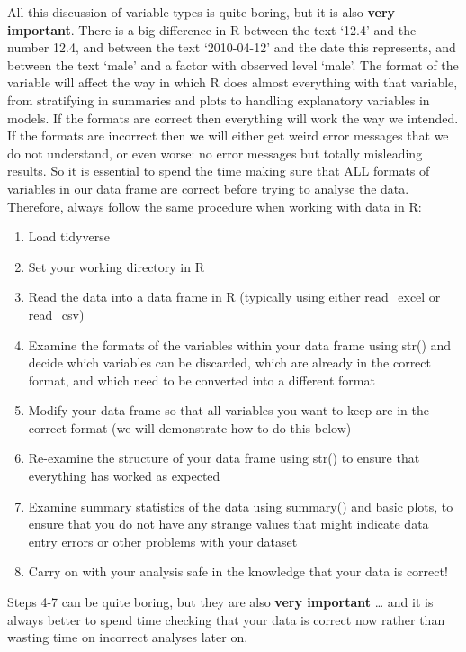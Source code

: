 \documentclass[
]{article}
\providecommand{\tightlist}{%
  \setlength{\itemsep}{0pt}\setlength{\parskip}{0pt}}
\begin{document}
All this discussion of variable types is quite boring, but it is also
\textbf{very important}. There is a big difference in R between the text
`12.4' and the number 12.4, and between the text `2010-04-12' and the
date this represents, and between the text `male' and a factor with
observed level `male'. The format of the variable will affect the way in
which R does almost everything with that variable, from stratifying in
summaries and plots to handling explanatory variables in models. If the
formats are correct then everything will work the way we intended. If
the formats are incorrect then we will either get weird error messages
that we do not understand, or even worse: no error messages but totally
misleading results. So it is essential to spend the time making sure
that ALL formats of variables in our data frame are correct before
trying to analyse the data. Therefore, always follow the same procedure
when working with data in R:

\begin{enumerate}
\def\labelenumi{\arabic{enumi})}
\tightlist
\item
  Load tidyverse
\item
  Set your working directory in R
\item
  Read the data into a data frame in R (typically using either
  read\_excel or read\_csv)
\item
  Examine the formats of the variables within your data frame using
  str() and decide which variables can be discarded, which are already
  in the correct format, and which need to be converted into a different
  format
\item
  Modify your data frame so that all variables you want to keep are in
  the correct format (we will demonstrate how to do this below)
\item
  Re-examine the structure of your data frame using str() to ensure that
  everything has worked as expected
\item
  Examine summary statistics of the data using summary() and basic
  plots, to ensure that you do not have any strange values that might
  indicate data entry errors or other problems with your dataset
\item
  Carry on with your analysis safe in the knowledge that your data is
  correct!
\end{enumerate}

Steps 4-7 can be quite boring, but they are also \textbf{very important}
\ldots{} and it is always better to spend time checking that your data
is correct now rather than wasting time on incorrect analyses later on.
\end{document}
